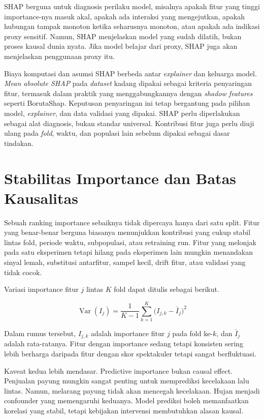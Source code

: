 SHAP berguna untuk diagnosis perilaku model, misalnya apakah fitur yang tinggi importance-nya masuk akal, apakah ada interaksi yang mengejutkan, apakah hubungan tampak monoton ketika seharusnya monoton, atau apakah ada indikasi proxy sensitif. Namun, SHAP menjelaskan model yang sudah dilatih, bukan proses kausal dunia nyata. Jika model belajar dari proxy, SHAP juga akan menjelaskan penggunaan proxy itu.

Biaya komputasi dan asumsi SHAP berbeda antar \emph{explainer} dan keluarga model. \emph{Mean absolute SHAP} pada \emph{dataset} kadang dipakai sebagai kriteria penyaringan fitur, termasuk dalam praktik yang menggabungkannya dengan \emph{shadow features} seperti BorutaShap. Keputusan penyaringan ini tetap bergantung pada pilihan model, \emph{explainer}, dan data validasi yang dipakai. SHAP perlu diperlakukan sebagai alat diagnosis, bukan standar universal. Kontribusi fitur juga perlu diuji ulang pada \emph{fold}, waktu, dan populasi lain sebelum dipakai sebagai dasar tindakan.

\section{Stabilitas Importance dan Batas Kausalitas}\label{stabilitas-importance-dan-batas-kausalitas}

Sebuah ranking importance sebaiknya tidak dipercaya hanya dari satu split. Fitur yang benar-benar berguna biasanya menunjukkan kontribusi yang cukup stabil lintas fold, periode waktu, subpopulasi, atau retraining run. Fitur yang melonjak pada satu eksperimen tetapi hilang pada eksperimen lain mungkin menandakan sinyal lemah, substitusi antarfitur, sampel kecil, drift fitur, atau validasi yang tidak cocok.

Variasi importance fitur \(j\) lintas \(K\) fold dapat ditulis sebagai berikut.

\[
\operatorname{Var}(I_j) = \dfrac{1}{K-1}\sum_{k=1}^{K}\big(I_{j,k} - \bar{I}_j\big)^2
\]

Dalam rumus tersebut, \(I_{j,k}\) adalah importance fitur \(j\) pada fold ke-\(k\), dan \(\bar{I}_j\) adalah rata-ratanya. Fitur dengan importance sedang tetapi konsisten sering lebih berharga daripada fitur dengan skor spektakuler tetapi sangat berfluktuasi.

Kaveat kedua lebih mendasar. Predictive importance bukan causal effect. Penjualan payung mungkin sangat penting untuk memprediksi kecelakaan lalu lintas. Namun, melarang payung tidak akan mencegah kecelakaan. Hujan menjadi confounder yang memengaruhi keduanya. Model prediksi boleh memanfaatkan korelasi yang stabil, tetapi kebijakan intervensi membutuhkan alasan kausal.

